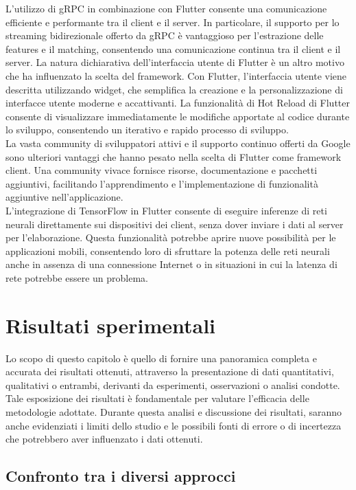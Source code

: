\documentclass[a4paper,12pt]{report}
\begin{document}
    L'utilizzo di gRPC in combinazione con Flutter consente una comunicazione efficiente e performante tra il client e il server. In particolare, il supporto per lo streaming bidirezionale offerto da gRPC è vantaggioso per l'estrazione delle features e il matching, consentendo una comunicazione continua tra il client e il server.
    La natura dichiarativa dell'interfaccia utente di Flutter è un altro motivo che ha influenzato la scelta del framework. Con Flutter, l'interfaccia utente viene descritta utilizzando widget, che semplifica la creazione e la personalizzazione di interfacce utente moderne e accattivanti. La funzionalità di Hot Reload di Flutter consente 
     di visualizzare immediatamente le modifiche apportate al codice durante lo sviluppo, consentendo un iterativo e rapido processo di sviluppo.
    \\
    La vasta community di sviluppatori attivi e il supporto continuo offerti da Google sono ulteriori vantaggi che hanno pesato nella scelta di Flutter come framework client. Una community vivace fornisce risorse, documentazione e pacchetti aggiuntivi, facilitando l'apprendimento e l'implementazione di funzionalità aggiuntive nell'applicazione.
    \\
    L'integrazione di TensorFlow in Flutter consente di eseguire inferenze di reti neurali direttamente sui dispositivi dei client, senza dover inviare i dati al server per l'elaborazione. Questa funzionalità potrebbe aprire nuove possibilità per le applicazioni mobili, consentendo loro di sfruttare la potenza delle reti neurali anche in assenza di una connessione Internet o in situazioni in cui la latenza di rete potrebbe essere un problema.
\chapter{Risultati sperimentali}
Lo scopo di questo capitolo è quello di fornire una panoramica completa e accurata dei risultati ottenuti, attraverso la presentazione di dati quantitativi, qualitativi o entrambi, derivanti da esperimenti, osservazioni o analisi condotte. Tale esposizione dei risultati è fondamentale per valutare l'efficacia delle metodologie adottate.
Durante questa analisi e discussione dei risultati, saranno anche evidenziati i limiti dello studio e le possibili fonti di errore o di incertezza che potrebbero aver influenzato i dati ottenuti.
  \section{Confronto tra i diversi approcci}
\end{document}
